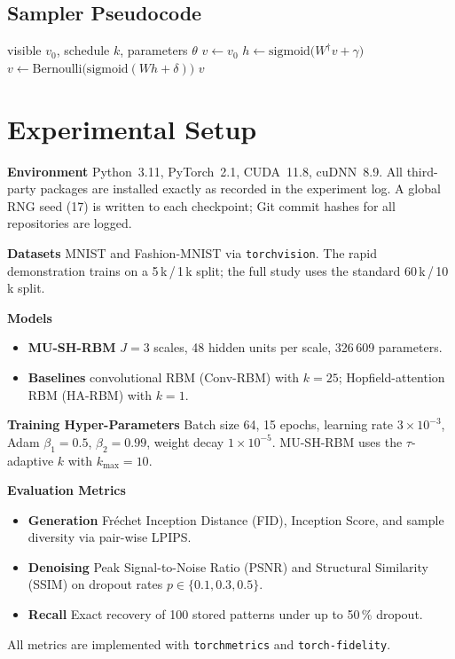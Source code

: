 \documentclass{article} %
\begin{document}
\subsection{Sampler Pseudocode}
\begin{algorithm}[H]
\caption{Adaptive Gibbs Sampler for MU-SH-RBM}
\begin{algorithmic}[1]
\Require visible $v_{0}$, schedule $k$, parameters $\theta$
\State $v \leftarrow v_{0}$
    \State $h \leftarrow \text{sigmoid}\bigl(W^{\dagger}v+\gamma\bigr)$
    \State $v \leftarrow \text{Bernoulli}\bigl(\text{sigmoid}(W h+\delta)\bigr)$
\EndFor
\Return $v$
\end{algorithmic}
\end{algorithm}

\section{Experimental Setup}
\label{sec:experimental}
\textbf{Environment}\; Python~3.11, PyTorch~2.1, CUDA~11.8, cuDNN~8.9. All third-party packages are installed exactly as recorded in the experiment log. A global RNG seed (17) is written to each checkpoint; Git commit hashes for all repositories are logged.

\textbf{Datasets}\; MNIST and Fashion-MNIST via \texttt{torchvision}. The rapid demonstration trains on a 5\,k\,/\,1\,k split; the full study uses the standard 60\,k\,/\,10\,k split.

\textbf{Models}
\begin{itemize}
    \item \textbf{MU-SH-RBM}\; $J=3$ scales, 48 hidden units per scale, 326\,609 parameters.
    \item \textbf{Baselines}\; convolutional RBM (Conv-RBM) with $k=25$; Hopfield-attention RBM (HA-RBM) with $k=1$.
\end{itemize}

\textbf{Training Hyper-Parameters}\; Batch size 64, 15 epochs, learning rate $3\times10^{-3}$, Adam $\beta_{1}=0.5$, $\beta_{2}=0.99$, weight decay $1\times10^{-5}$. MU-SH-RBM uses the $\tau$-adaptive $k$ with $k_{\max}=10$.

\textbf{Evaluation Metrics}
\begin{itemize}
    \item \textbf{Generation}\; Fréchet Inception Distance (FID), Inception Score, and sample diversity via pair-wise LPIPS.
    \item \textbf{Denoising}\; Peak Signal-to-Noise Ratio (PSNR) and Structural Similarity (SSIM) on dropout rates $p\in\{0.1,0.3,0.5\}$.
    \item \textbf{Recall}\; Exact recovery of 100 stored patterns under up to 50\,\% dropout.
\end{itemize}
All metrics are implemented with \texttt{torchmetrics} and \texttt{torch-fidelity}.
\end{document}
